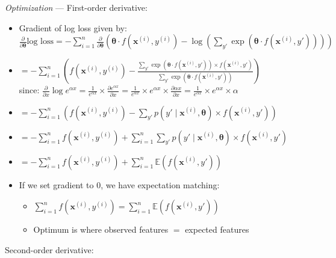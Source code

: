 \emph{Optimization} ---
First-order derivative:
\begin{itemize}
    \item Gradient of log loss given by:
    $
    \frac{\partial}{\partial \boldsymbol{\theta}} \textrm{log loss} = -\sum_{i=1}^n \frac{\partial}{\partial \boldsymbol{\theta}} \left( \boldsymbol{\theta} \cdot f(\boldsymbol{x}^{(i)}, y^{(i)}) - \log(\sum_{y'} \exp(\boldsymbol{\theta} \cdot f(\boldsymbol{x}^{(i)}, y')))\right)
    $
    \item $
    = -\sum_{i=1}^n \left( f(\boldsymbol{x}^{(i)}, y^{(i)}) - \frac{\sum_{y'} \exp(\boldsymbol{\theta} \cdot f(\boldsymbol{x}^{(i)}, y')) \times f(\boldsymbol{x}^{(i)}, y')}{\sum_{y'} \exp(\boldsymbol{\theta} \cdot f(\boldsymbol{x}^{(i)}, y'))} \right)
    $\\
    since:
    $\frac{\partial}{\partial x} \log{e^{\alpha x}} = \frac{1}{e^{\alpha x}} \times \frac{\partial e^{\alpha x}}{\partial x} = \frac{1}{e^{\alpha x}} \times e^{\alpha x} \times \frac{\partial \alpha x}{\partial x} = \frac{1}{e^{\alpha x}} \times e^{\alpha x} \times \alpha$
    \item $
    = - \sum_{i=1}^n \left( f(\boldsymbol{x}^{(i)}, y^{(i)}) - \sum_{y'} p(y' \mid \boldsymbol{x}^{(i)}, \boldsymbol{\theta}) \times f(\boldsymbol{x}^{(i)}, y') \right)
    $
    \item $
    = - \sum_{i=1}^n f(\boldsymbol{x}^{(i)}, y^{(i)}) + \sum_{i=1}^n \sum_{y'} p(y' \mid \boldsymbol{x}^{(i)}, \boldsymbol{\theta}) \times f(\boldsymbol{x}^{(i)}, y')
    $
    \item $
    = - \sum_{i=1}^n f(\boldsymbol{x}^{(i)}, y^{(i)}) + \sum_{i=1}^n \mathbb{E}(f(\boldsymbol{x}^{(i)}, y'))
    $
    \item If we set gradient to 0, we have expectation matching:
    \begin{itemize}
        \item $\sum_{i=1}^n f(\boldsymbol{x}^{(i)}, y^{(i)}) = \sum_{i=1}^n \mathbb{E}(f(\boldsymbol{x}^{(i)}, y'))$
        \item Optimum is where observed features $=$ expected features
    \end{itemize}
\end{itemize}
Second-order derivative:
